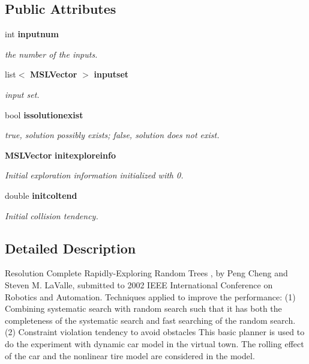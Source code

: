 \subsection*{Public Attributes}
\begin{CompactItemize}
\item 
int {\bf inputnum}
\begin{CompactList}\small\item\em the number of the inputs.\item\end{CompactList}\item 
list$<$ {\bf MSLVector} $>$ {\bf inputset}
\begin{CompactList}\small\item\em input set.\item\end{CompactList}\item 
bool {\bf issolutionexist}
\begin{CompactList}\small\item\em true, solution possibly exists; false, solution does not exist.\item\end{CompactList}\item 
{\bf MSLVector} {\bf initexploreinfo}
\begin{CompactList}\small\item\em Initial exploration information initialized with 0.\item\end{CompactList}\item 
double {\bf initcoltend}
\begin{CompactList}\small\item\em Initial collision tendency.\item\end{CompactList}\end{CompactItemize}


\subsection{Detailed Description}
Resolution Complete Rapidly-Exploring Random Trees , by Peng Cheng and Steven M. La\-Valle, submitted to 2002 IEEE International Conference on Robotics and Automation. Techniques applied to improve the performance: (1) Combining systematic search with random search such that it has both the completeness of the systematic search and fast searching of the random search. (2) Constraint violation tendency to avoid obstacles This basic planner is used to do the experiment with dynamic car model in the virtual town. The rolling effect of the car and the nonlinear tire model are considered in the model.



